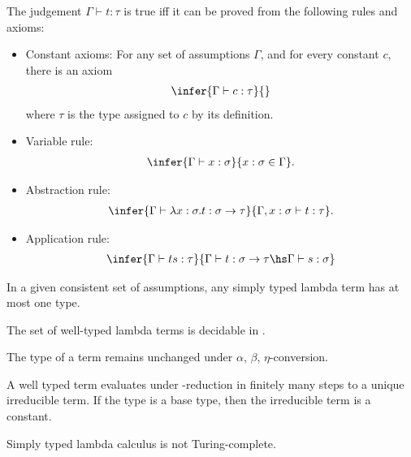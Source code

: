 \documentclass{article}
\begin{document}
\begin{definition*}
	The judgement $\Gamma\vdash t:\tau$ is true iff it can be proved from the following rules and 
	axioms:
	\begin{itemize}
		\item Constant axioms: For any set of assumptions $\Gamma$, and for every constant $c$, there is an axiom \begin{align*}
			\infer{\Gamma \vdash c:\tau}{}
		\end{align*}
		where $\tau$ is the type assigned to $c$ by its definition.
		\item Variable rule: \begin{align*}
			\infer{\Gamma\vdash x:\sigma}{x:\sigma \in\Gamma}.
		\end{align*}
		\item Abstraction rule: \begin{align*}
			\infer{\Gamma\vdash \lambda x:\sigma.t:\sigma\to\tau}{\Gamma,x:\sigma\vdash t:\tau}.
		\end{align*}
		\item Application rule: \begin{align*}
			\infer{\Gamma \vdash ts : \tau }{\Gamma \vdash t : \sigma\to\tau \hs \Gamma\vdash s:\sigma}
		\end{align*}
	\end{itemize}
\end{definition*}

\begin{theorem*}
	In a given consistent set of assumptions, any simply typed lambda term has at most one type. 
\end{theorem*}

\begin{theorem*}[III.11]
	The set of well-typed lambda terms is decidable in \ptime.
\end{theorem*}

\begin{theorem*}
	The type of a term remains unchanged under $\alpha$, $\beta$, $\eta$-conversion.
\end{theorem*}

\begin{theorem*}
	A well typed term evaluates under \beta-reduction in finitely many steps to a unique irreducible
	term. If the type is a base type, then the irreducible term is a constant.
\end{theorem*}

\begin{corollary*}[III.14]
	Simply typed lambda calculus is not Turing-complete.
\end{corollary*}
\end{document}
